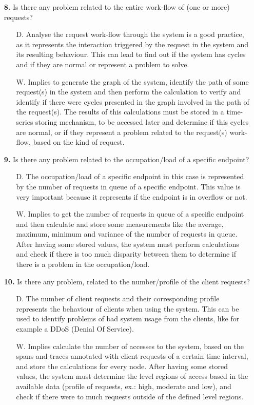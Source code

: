 \begin{itemize}
    \item[\textbf{8.}] Is there any problem related to the entire work-flow of (one or more) requests?
    \begin{itemize}
        \item[D.] Analyse the request work-flow through the system is a good practice, as it represents the interaction triggered by the request in the system and its resulting behaviour. This can lead to find out if the system has cycles and if they are normal or represent a problem to solve.  
        \item[W.] Implies to generate the graph of the system, identify the path of some request(s) in the system and then perform the calculation to verify and identify if there were cycles presented in the graph involved in the path of the request(s). The results of this calculations must be stored in a time-series storing mechanism, to be accessed later and determine if this cycles are normal, or if they represent a problem related to the request(s) work-flow, based on the kind of request.
    \end{itemize}

    \item[\textbf{9.}] Is there any problem related to the occupation/load of a specific endpoint?
    \begin{itemize}
        \item[D.] The occupation/load of a specific endpoint in this case is represented by the number of requests in queue of a specific endpoint. This value is very important because it represents if the endpoint is in overflow or not.
        \item[W.] Implies to get the number of requests in queue of a specific endpoint and then calculate and store some measurements like the average, maximum, minimum and variance of the number of requests in queue. After having some stored values, the system must perform calculations and check if there is too much disparity between them to determine if there is a problem in the occupation/load.
    \end{itemize}

    \item[\textbf{10.}] Is there any problem, related to the number/profile of the client requests?
    \begin{itemize}
        \item[D.] The number of client requests and their corresponding profile represents the behaviour of clients when using the system. This can be used to identify problems of bad system usage from the clients, like for example a DDoS (Denial Of Service).
        \item[W.] Implies calculate the number of accesses to the system, based on the spans and traces annotated with client requests of a certain time interval, and store the calculations for every node. After having some stored values, the system must determine the level regions of access based in the available data (profile of requests, ex.: high, moderate and low), and check if there were to much requests outside of the defined level regions.
    \end{itemize}
\end{itemize}

